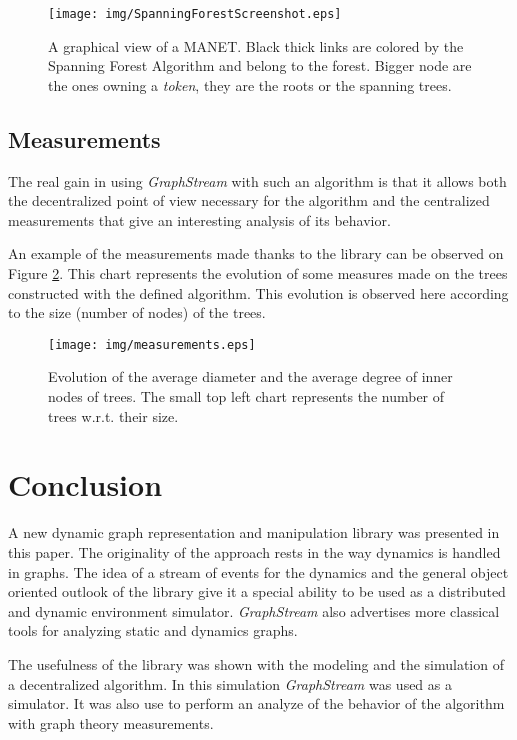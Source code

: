 \documentclass{svmult}
\begin{document}
\begin{figure}[h]
        \centering
                \texttt{[image: img/SpanningForestScreenshot.eps]}
        \caption{A graphical view of a MANET. Black thick links are colored by
                the Spanning Forest Algorithm and belong to the forest. Bigger
                node are the ones owning a \emph{token}, they are the roots or
                the spanning trees.} 
        \label{fig:SpanningForestScreenshot}
\end{figure}


\subsection{Measurements}


The real gain in using \emph{GraphStream} with such an algorithm is that it
allows both the decentralized point of view necessary for the algorithm and
the centralized measurements that give an interesting analysis of its behavior.  

An example of the measurements made thanks to the library can be observed on
Figure \ref{fig:measurements}. 
This chart represents the evolution of some measures made on the trees
constructed with the defined algorithm. 
This evolution is observed here according to the size (number of nodes) of the
trees.   

\begin{figure}[!h]
        \centering
                \texttt{[image: img/measurements.eps]}
        \caption{ Evolution of the average diameter and the average degree of
                inner nodes of trees. The small top left chart
                represents the number of trees w.r.t. their size.} 
        \label{fig:measurements}
\end{figure}
\FloatBarrier
\section{Conclusion}


A new dynamic graph representation and manipulation library was presented in
this paper. The originality of the approach rests in the way dynamics is
handled in graphs.  
The idea of a stream of events for the dynamics and the general object
oriented outlook of the library give it a special ability to be used as a
distributed and dynamic environment simulator. \emph{GraphStream} also
advertises more classical tools for analyzing static and dynamics graphs.      

The usefulness of the library was shown with the modeling and the simulation
of a decentralized algorithm. In this simulation \emph{GraphStream} was used
as a simulator. It was also use to perform an analyze of the behavior of the
algorithm with graph theory measurements.  






\end{document}
